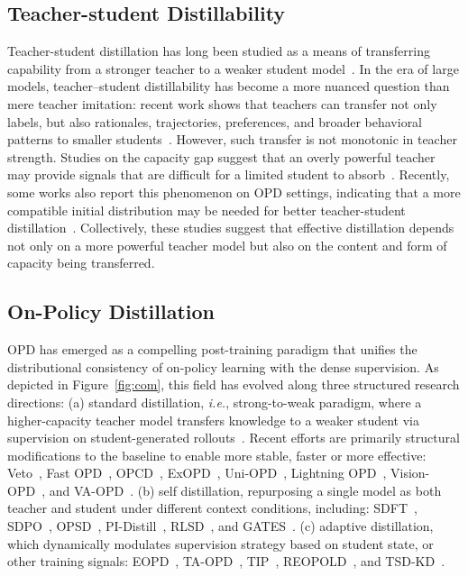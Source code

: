 \documentclass[]{jingdong}
\theoremstyle{plain}
\theoremstyle{definition}
\theoremstyle{remark}
\begin{document}
\subsection{Teacher-student Distillability}
Teacher-student distillation has long been studied as a means of transferring capability from a stronger teacher to a weaker student model~\citep{kim2016sequence,sanh2019distilbert,yu2026latent}. In the era of large models, teacher–student distillability has become a more nuanced question than mere teacher imitation: recent work shows that teachers can transfer not only labels, but also rationales, trajectories, preferences, and broader behavioral patterns to smaller students~\citep{hsieh2023distilling,gu2024minillm,agarwal2024policy}. However, such transfer is not monotonic in teacher strength. Studies on the capacity gap suggest that an overly powerful teacher may provide signals that are difficult for a limited student to absorb~\citep{busbridge2025distillation,li2025small,xu2025speculative}. 
Recently, some works also report this phenomenon on OPD settings, indicating that a more compatible initial distribution may be needed for better teacher-student distillation~\citep{li2026rethinking,fu2026revisiting,ko2026scaling,agarwal2024policy}.
Collectively, these studies suggest that effective distillation depends not only on a more powerful teacher model but also on the  content and form of capacity being transferred.





\subsection{On-Policy Distillation}
OPD has emerged as a compelling post-training paradigm that unifies the distributional consistency of on-policy learning with the dense supervision. As depicted in Figure~\ref{fig:com}, this field has evolved along three structured research directions: 
(a) standard distillation, \textit{i.e.}, strong-to-weak paradigm, where a higher-capacity teacher model transfers knowledge to a weaker student via supervision on student-generated rollouts~\citep{agarwal2024policy,ko2025distillm,thinking2025opd}. Recent efforts are primarily  structural modifications to the baseline to enable more stable, faster or more effective: Veto~\citep{jang2026stable}, Fast OPD~\citep{zhang2026fast}, OPCD~\citep{ye2026policy}, ExOPD~\citep{yang2026learning}, Uni-OPD~\citep{hou2026uni}, Lightning OPD~\citep{wu2026lightning}, Vision-OPD~\citep{yuan2026vision}, and VA-OPD~\citep{liu2026visual}. 
(b) self distillation, repurposing a single model as both teacher and student under different context conditions, including: SDFT~\citep{shenfeld2026self}, SDPO~\citep{hubotter2026reinforcement}, OPSD~\citep{zhao2026self}, PI-Distill~\citep{penaloza2026privileged}, RLSD~\citep{yang2026self}, and GATES~\citep{stein2026gates}.
(c) adaptive distillation, which dynamically modulates supervision strategy based on student state, or other training signals: EOPD~\citep{jin2026entropy}, TA-OPD~\citep{wang2026not}, TIP~\citep{xu2026tip}, REOPOLD~\citep{ko2026scaling}, and TSD-KD~\citep{kim2026explain}.
\end{document}

